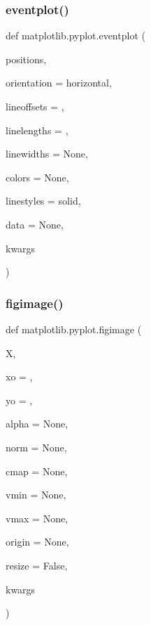 \subsubsection{\texorpdfstring{eventplot()}{eventplot()}}
{\footnotesize\ttfamily def matplotlib.\+pyplot.\+eventplot (\begin{DoxyParamCaption}\item[{}]{positions,  }\item[{}]{orientation = {\ttfamily \textquotesingle{}horizontal\textquotesingle{}},  }\item[{}]{lineoffsets = {},  }\item[{}]{linelengths = {},  }\item[{}]{linewidths = {\ttfamily None},  }\item[{}]{colors = {\ttfamily None},  }\item[{}]{linestyles = {\ttfamily \textquotesingle{}solid\textquotesingle{}},  }\item[{}]{data = {\ttfamily None},  }\item[{}]{kwargs }\end{DoxyParamCaption})}

\mbox{\label{namespacematplotlib_1_1pyplot_ac063c7afc5dc35f98c550f42f90da996}} 
\subsubsection{\texorpdfstring{figimage()}{figimage()}}
{\footnotesize\ttfamily def matplotlib.\+pyplot.\+figimage (\begin{DoxyParamCaption}\item[{}]{X,  }\item[{}]{xo = {},  }\item[{}]{yo = {},  }\item[{}]{alpha = {\ttfamily None},  }\item[{}]{norm = {\ttfamily None},  }\item[{}]{cmap = {\ttfamily None},  }\item[{}]{vmin = {\ttfamily None},  }\item[{}]{vmax = {\ttfamily None},  }\item[{}]{origin = {\ttfamily None},  }\item[{}]{resize = {\ttfamily False},  }\item[{}]{kwargs }\end{DoxyParamCaption})}




